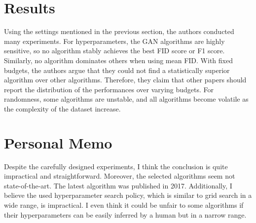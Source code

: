 \documentclass[10pt,twocolumn,letterpaper]{article}
\begin{document}
\section{Results}
\vspace{-0.2cm}
Using the settings mentioned in the previous section, the authors conducted many experiments. For hyperparameters, the GAN algorithms are highly sensitive, so no algorithm stably achieves the best FID score or F1 score. Similarly, no algorithm dominates others when using mean FID. With fixed budgets, the authors argue that they could not find a statistically superior algorithm over other algorithms. Therefore, they claim that other papers should report the distribution of the performances over varying budgets. For randomness, some algorithms are unstable, and all algorithms become volatile as the complexity of the dataset increase.


\section{Personal Memo}
Despite the carefully designed experiments, I think the conclusion is quite impractical and straightforward. Moreover, the selected algorithms seem not state-of-the-art. The latest algorithm was published in 2017. Additionally, I believe the used hyperparameter search policy, which is similar to grid search in a wide range, is impractical. I even think it could be unfair to some algorithms if their hyperparameters can be easily inferred by a human but in a narrow range.

{\small

% 
}
\end{document}
